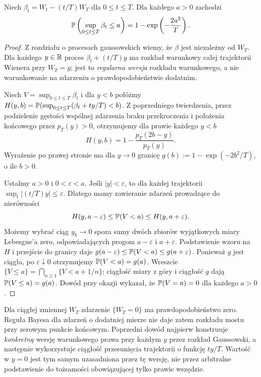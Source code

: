 \begin{wniosek}
Niech $\beta_t=W_t-(t/T)W_T$ dla $0\le t\le T$.
Dla każdego $a>0$ zachodzi
\[
\mathbb{P}\left(\sup_{0\le t\le T}\beta_t\le a\right)
=1-\exp\left(-\frac{2a^2}{T}\right).
\]
\end{wniosek}
\begin{proof}
Z rozdziału o procesach gaussowskich wiemy, że $\beta$ jest
niezależny od $W_T$. Dla każdego $y\in\mathbb{R}$ proces
$\beta_t+(t/T)y$ ma rozkład warunkowy całej trajektorii
Wienera przy $W_T=y$; jest to \emph{regularna wersja}
rozkładu warunkowego, a nie warunkowanie na zdarzeniu o
prawdopodobieństwie dodatnim.

Niech $V=\sup_{0\le t\le T}\beta_t$ i dla $y<b$ połóżmy
$H(y,b)=\mathbb{P}(\sup_{0\le t\le T}(\beta_t+ty/T)<b)$.
Z poprzedniego twierdzenia, przez podzielenie gęstości
wspólnej zdarzenia braku przekroczenia i położenia końcowego
przez $p_T(y)>0$, otrzymujemy dla prawie każdego $y<b$
\[
H(y,b)=1-\frac{p_T(2b-y)}{p_T(y)}.
\]
Wyrażenie po prawej stronie ma dla $y\to0$ granicę
$g(b):=1-\exp(-2b^2/T)$, o ile $b>0$.

Ustalmy $a>0$ i $0<\varepsilon<a$. Jeśli $|y|<\varepsilon$,
to dla każdej trajektorii $\sup_t|(t/T)y|\le\varepsilon$.
Dlatego mamy zawieranie zdarzeń prowadzące do nierówności
\[
H(y,a-\varepsilon)\le\mathbb{P}(V<a)
\le H(y,a+\varepsilon).
\]
Możemy wybrać ciąg $y_k\to0$ spoza sumy dwóch zbiorów
wyjątkowych miary Lebesgue'a zero, odpowiadających progom
$a-\varepsilon$ i $a+\varepsilon$. Podstawienie wzoru
na $H$ i przejście do granicy daje
$g(a-\varepsilon)\le\mathbb{P}(V<a)\le g(a+\varepsilon)$.
Ponieważ $g$ jest ciągła, po $\varepsilon\downarrow0$
otrzymujemy $\mathbb{P}(V<a)=g(a)$. Wreszcie
$\{V\le a\}=\bigcap_{n\ge1}\{V<a+1/n\}$;
ciągłość miary z góry i ciągłość $g$ dają
$\mathbb{P}(V\le a)=g(a)$. Dowód przy okazji wykazał,
że $\mathbb{P}(V=a)=0$ dla każdego $a>0$.
\end{proof}


\begin{uwaga}
Dla ciągłej zmiennej $W_T$ zdarzenie $\{W_T=0\}$ ma
prawdopodobieństwo zero. Reguła Bayesa dla zdarzeń o dodatniej
mierze nie daje zatem rozkładu mostu przy zerowym punkcie
końcowym. Poprzedni dowód najpierw konstruuje \emph{konkretną}
wersję warunkowego prawa przy każdym $y$ przez rozkład
Gaussowski, a następnie wykorzystuje ciągłość przesunięcia
trajektorii o funkcję $ty/T$. Wartość w $y=0$ jest tym
samym uzasadniona przez tę wersję, nie przez arbitralne
podstawienie do tożsamości obowiązującej tylko prawie wszędzie.
\end{uwaga}

